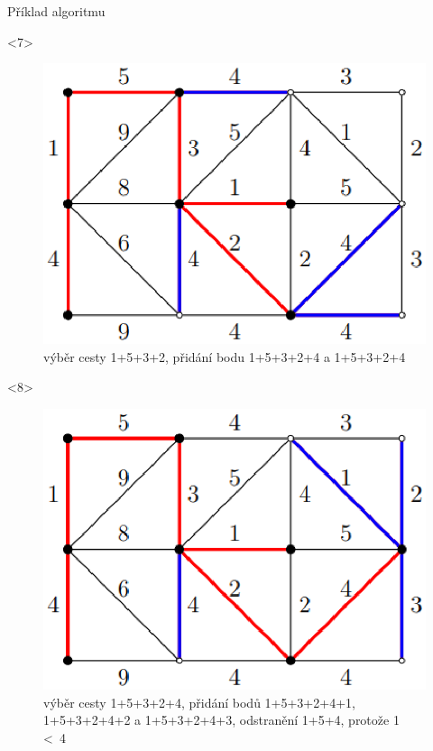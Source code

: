 \documentclass[pdf]{beamer}
\begin{document}
\begin{centering}
\begin{frame}{Příklad algoritmu}
    \begin{onlyenv}<7>
        \begin{figure}[h!]
        \includegraphics[scale=0.5]{obr7.eps}
        \caption{\label{fig:obr7}výběr cesty 1+5+3+2, přidání bodu 1+5+3+2+4 a 1+5+3+2+4}
        \end{figure}
    \end{onlyenv}
    
    \begin{onlyenv}<8>
        \begin{figure}[h!]
        \includegraphics[scale=0.5]{obr8.eps}
        \caption{\label{fig:obr8}výběr cesty 1+5+3+2+4, přidání bodů 1+5+3+2+4+1, 1+5+3+2+4+2 a 1+5+3+2+4+3, odstranění 1+5+4, protože 1 \textless~4}
        \end{figure}
    \end{onlyenv}
    

\end{frame}
\end{centering}
\end{document}

